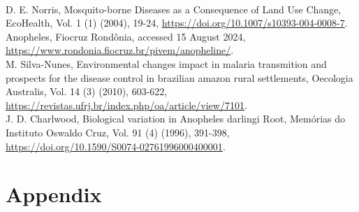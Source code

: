 \documentclass[a4paper,fleqn]{cas-dc}
\begin{document}
\begin{thebibliography}{00}
\\
 D. E. Norris, Mosquito-borne Diseases as a Consequence of Land Use Change, EcoHealth, Vol. 1 (1) (2004), 19-24, \href{https://doi.org/10.1007/s10393-004-0008-7}{https://doi.org/10.1007/s10393-004-0008-7}.
\\
 Anopheles, Fiocruz Rondônia, accessed 15 August 2024, \href{https://www.rondonia.fiocruz.br/pivem/anopheline/}{https://www.rondonia.fiocruz.br/pivem/anopheline/}.
\\
 M. Silva-Nunes, Environmental changes impact in malaria transmition and prospects for the disease control in brazilian amazon rural settlements, Oecologia Australis, Vol. 14 (3) (2010), 603-622, \href{https://revistas.ufrj.br/index.php/oa/article/view/7101}{https://revistas.ufrj.br/index.php/oa/article/view/7101}.
\\
 J. D. Charlwood, Biological variation in Anopheles darlingi Root, Memórias do Instituto Oswaldo Cruz, Vol. 91 (4) (1996), 391-398, \href{ https://doi.org/10.1590/S0074-02761996000400001}{ https://doi.org/10.1590/S0074-02761996000400001}.
\\

\end{thebibliography}

\clearpage

\appendix
\renewcommand{\thetable}{A.\arabic{table}}
\setcounter{table}{0}  %

\section{Appendix}
\end{document}
